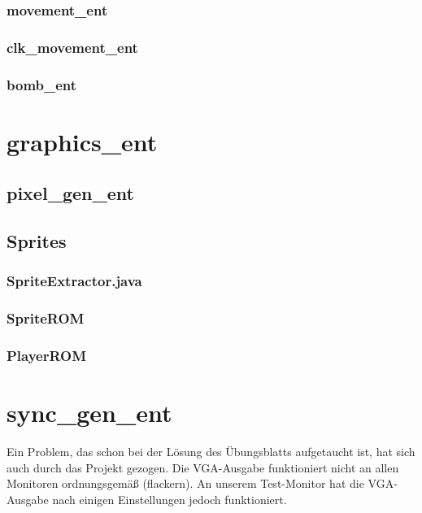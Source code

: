 \documentclass[parskip=full]{scrartcl}
\begin{document}
				\subsubsection{movement\_ent}

				\subsubsection{clk\_movement\_ent}

				\subsubsection{bomb\_ent}

		\section{graphics\_ent}

			\subsection{pixel\_gen\_ent}
	
			\subsection{Sprites}

				\subsubsection{SpriteExtractor.java}

				\subsubsection{SpriteROM}

				\subsubsection{PlayerROM}
		
		\section{sync\_gen\_ent}
			Ein Problem, das schon bei der Lösung des Übungsblatts aufgetaucht ist, hat sich auch durch das Projekt gezogen.
			Die VGA-Ausgabe funktioniert nicht an allen Monitoren ordnungsgemäß (flackern). An unserem Test-Monitor hat die VGA-Ausgabe nach einigen Einstellungen jedoch funktioniert.
\end{document}
